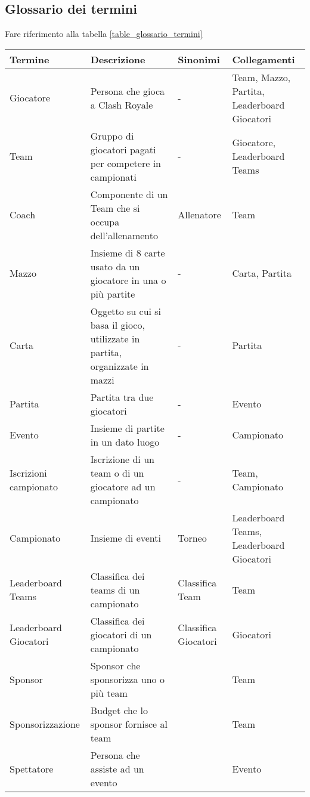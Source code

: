 \documentclass{article}
\begin{document}
\subsection{Glossario dei termini}


Fare riferimento alla tabella \ref{table_glossario_termini}

\begin{table}
\centering

\begin{tabularx}{\textwidth}{|l|X|l|X|}
\hline
\textbf{Termine}   & \textbf{Descrizione} & \textbf{Sinonimi} & \textbf{Collegamenti} \\ \hline
Giocatore & Persona che gioca a Clash Royale & - & Team, Mazzo, Partita, Leaderboard Giocatori \\ \hline
Team      & Gruppo di giocatori pagati per competere in campionati & - & Giocatore, Leaderboard Teams \\ \hline
Coach      & Componente di un Team che si occupa dell'allenamento & Allenatore & Team \\ \hline
Mazzo   & Insieme di 8 carte usato da un giocatore in una o più partite & - & Carta, Partita \\ \hline
Carta   & Oggetto su cui si basa il gioco, utilizzate in partita, organizzate in mazzi & - & Partita \\ \hline
Partita   & Partita tra due giocatori & - & Evento \\ \hline
Evento   & Insieme di partite in un dato luogo & - & Campionato \\ \hline
Iscrizioni campionato   & Iscrizione di un team o di un giocatore ad un campionato & - & Team, Campionato \\ \hline
Campionato   & Insieme di eventi & Torneo & Leaderboard Teams, Leaderboard Giocatori \\ \hline
Leaderboard Teams   & Classifica dei teams di un campionato & Classifica Team & Team \\ \hline
Leaderboard Giocatori & Classifica dei giocatori di un campionato & Classifica Giocatori & Giocatori \\ \hline
Sponsor & Sponsor che sponsorizza uno o più team & & Team \\ \hline
Sponsorizzazione & Budget che lo sponsor fornisce al team & & Team \\ \hline
Spettatore & Persona che assiste ad un evento & & Evento \\ \hline

\end{tabularx}
\end{table}
\end{document}
